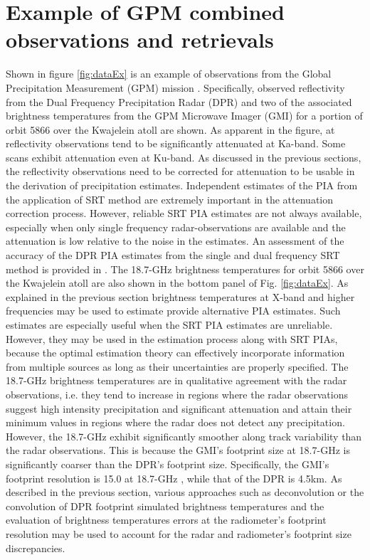 \documentclass[10pt]{ietbook}
\begin{document}
\section{Example of GPM combined observations and retrievals}
Shown in figure \ref{fig:dataEx} is an example of observations from the Global Precipitation Measurement (GPM) mission \cite{gail2017}.
Specifically, observed reflectivity from the Dual Frequency Precipitation Radar (DPR) and two of the associated brightness temperatures
from the GPM Microwave Imager (GMI) \cite{gail2017} for a portion of orbit 5866 over the Kwajelein atoll are shown. 
As apparent in the figure, at reflectivity observations tend to be significantly attenuated 
at Ka-band. Some scans exhibit attenuation even at Ku-band.  As discussed in the previous sections, the reflectivity observations need
to be corrected for attenuation to be usable in the derivation of precipitation estimates. Independent estimates of the PIA from the application
of SRT method are extremely important in the attenuation correction process.  However, reliable SRT PIA estimates are not always available,
especially when only single frequency radar-observations are available and the attenuation is low relative to the noise in the estimates.
An assessment of the accuracy of the DPR PIA estimates from the single and dual frequency SRT method is provided in \cite{meneghini2015}.
The 18.7-GHz brightness temperatures for orbit 5866 over the Kwajelein atoll are also shown in the bottom panel of Fig. \ref{fig:dataEx}.
As explained in the previous section brightness temperatures at X-band and higher frequencies may be used to estimate provide alternative PIA
estimates.  Such estimates are especially useful when the SRT PIA estimates are unreliable. However, they may be used in the estimation process along 
with SRT PIAs, because the optimal estimation theory can effectively incorporate information from multiple sources as long as their uncertainties are 
properly specified.  The 18.7-GHz brightness temperatures are in qualitative agreement with the radar observations, i.e. they tend to increase
in regions where the radar observations suggest high intensity precipitation and significant attenuation and attain their minimum values in regions
where the radar does not detect any precipitation.  However, the 18.7-GHz exhibit significantly smoother along track variability than the radar
observations.  This is because the GMI's footprint size at 18.7-GHz is significantly coarser than the DPR's footprint size. Specifically,
the GMI's footprint resolution is 15.0 at 18.7-GHz \cite{gmi2015}, while that of the DPR is 4.5km.  As described in the previous section,
various approaches such as deconvolution or the convolution of DPR footprint simulated brightness temperatures and the evaluation of brightness
temperatures errors at the radiometer's footprint resolution may be used to account for the radar and radiometer's footprint size discrepancies.
\end{document}
